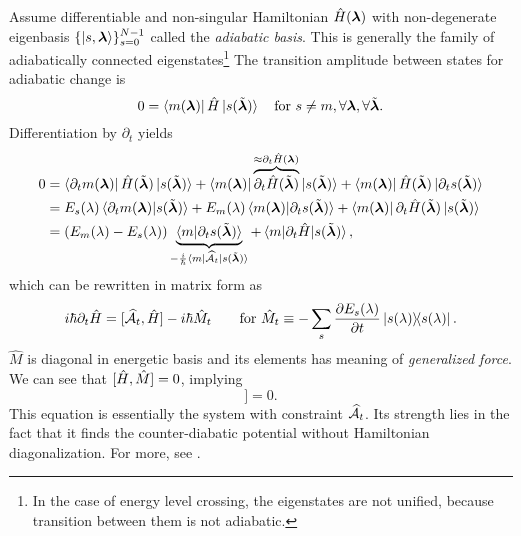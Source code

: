 Assume differentiable and non-singular Hamiltonian $\HH(\llambda)$ with non-degenerate eigenbasis $\{\ket{s,\llambda}\}_{s=0}^{N-1}$ called the \emph{adiabatic basis}. This is generally the family of adiabatically connected eigenstates\footnote{In the case of energy level crossing, the eigenstates are not unified, because transition between them is not adiabatic.} The transition amplitude between states for adiabatic change is
\begin{equation}
    0=\bra{m(\llambda)}\HH\ket{s(\tilde\llambda)} \quad \text{for }s\neq m, \forall \llambda,\forall \tilde \llambda.
\end{equation}
Differentiation by $\partial_t$ yields
\begin{equation}
    \begin{split}
        0&=\bra{\partial_t m(\llambda)}\HH(\tilde \llambda)\ket{s(\tilde\llambda)}+ \bra{m(\llambda)}\overbrace{\partial_t\HH(\tilde \llambda)}^{\approx \partial_t\HH(\llambda)}\ket{s(\tilde\llambda)}+ \bra{m(\llambda)}\HH(\tilde \llambda)\ket{\partial_t s(\tilde \llambda)}\\
        &=E_s(\lambda)\braket{\partial_t m(\llambda)|s(\tilde \llambda)} + E_m(\lambda)\braket{m(\llambda)|\partial_t s(\tilde \llambda)}+ \bra{m(\llambda)}\partial_t \HH(\tilde\llambda)\ket{s(\tilde \llambda)}\\
        &= (E_m(\lambda)-E_s(\lambda))\underbrace{\braket{m|\partial_t s(\tilde \llambda)}}_{-\frac{i}{\hbar}\bra{m}\AA_t\ket{s(\tilde \llambda)}} + \braket{m|\partial_t\HH|s(\tilde \llambda)},
    \end{split}
\end{equation}
which can be rewritten in matrix form as
\begin{equation}
    i\hbar\partial_t\HH=[\AA_t,\HH]-i\hbar \hat{M}_t\qquad \text{for } \hat{M}_t\equiv -\sum_s\pder{E_s(\lambda)}{t}\ket{s(\lambda)}\!\!\bra{s(\lambda)}.
\end{equation}
$\hat{M}$ is diagonal in energetic basis and its elements has meaning of \emph{generalized force}. We can see that $[\HH,\hat{M}]=0$, implying
\begin{equation}
    [\HH,i\hbar\partial_t\HH-[\AA_t,\HH]]=0.
    \label{eq:komutation}
\end{equation}
This equation is essentially the system with constraint $\AA_t$. Its strength lies in the fact that it finds the counter-diabatic potential without Hamiltonian diagonalization. For more, see \citet[Chap. 2.3]{kolodrubez}.










